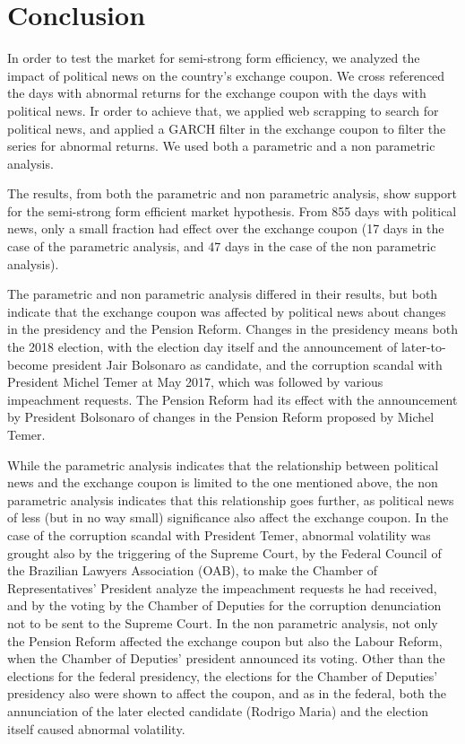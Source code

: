 \documentclass[cic,tc, english]{iiufrgs}
\begin{document}
\chapter{Conclusion} \label{chapter_conclusion}

    In order to test the market for semi-strong form efficiency, we analyzed the impact of political news on the country's exchange coupon. We cross referenced the days with abnormal returns for the exchange coupon with the days with political news. Ir order to achieve that, we applied web scrapping to search for political news, and applied a GARCH filter in the exchange coupon to filter the series for abnormal returns. We used both a parametric and a non parametric analysis.

    The results, from both the parametric and non parametric analysis, show support for the semi-strong form efficient market hypothesis. From 855 days with political news, only a small fraction had effect over the exchange coupon (17 days in the case of the parametric analysis, and 47 days in the case of the non parametric analysis).

    The parametric and non parametric analysis differed in their results, but both indicate that the exchange coupon was affected by political news about changes in the presidency and the Pension Reform. Changes in the presidency means both the 2018 election, with the election day itself and the announcement of later-to-become president Jair Bolsonaro as candidate, and the corruption scandal with President Michel Temer at May 2017, which was followed by various impeachment requests. The Pension Reform had its effect with the announcement by President Bolsonaro of changes in the Pension Reform proposed by Michel Temer.

    While the parametric analysis indicates that the relationship between political news and the exchange coupon is limited to the one mentioned above, the non parametric analysis indicates that this relationship goes further, as political news of less (but in no way small) significance also affect the exchange coupon. In the case of the corruption scandal with President Temer, abnormal volatility was grought also by the triggering of the Supreme Court, by the Federal Council of the Brazilian Lawyers Association (OAB), to make the Chamber of Representatives' President analyze the impeachment requests he had received, and by the voting by the Chamber of Deputies for the corruption denunciation not to be sent to the Supreme Court. In the non parametric analysis, not only the Pension Reform affected the exchange coupon but also the Labour Reform, when the Chamber of Deputies' president announced its voting. Other than the elections for the federal presidency, the elections for the Chamber of Deputies' presidency also were shown to affect the coupon, and as in the federal, both the annunciation of the later elected candidate (Rodrigo Maria) and the election itself caused abnormal volatility.
\end{document}
